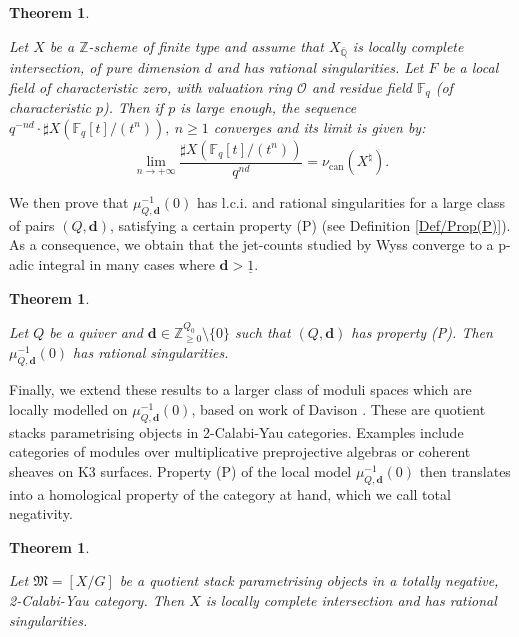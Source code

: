 \documentclass[11pt,english]{article}
\numberwithin{equation}{section}
\numberwithin{figure}{section}
\theoremstyle{definition}
\theoremstyle{plain}
\newtheorem{thm}[df]{Theorem}
\theoremstyle{remark}
\newcommand\dd{\mathbf{d}}
\newcommand\ZZ{\mathbb{Z}}
\newcommand\QQ{\mathbb{Q}}
\newcommand\FF{\mathbb{F}}
\begin{document}
\begin{thm} \label{Thm/Ch3JetCountCanMeas}

Let $X$ be a $\mathbb{Z}$-scheme of finite type and assume that
$X_{\bar{\QQ}}$ is locally complete intersection, of pure dimension
$d$ and has rational singularities. Let $F$ be a local field of
characteristic zero, with valuation ring $\mathcal{O}$ and residue
field $\FF_{q}$ (of characteristic $p$). Then if $p$ is large enough,
the sequence $q^{-nd}\cdot\sharp X(\mathbb{F}_{q}[t]/(t^{n})),\ n\geq1$
converges and its limit is given by:\[
\underset{n\rightarrow +\infty}{\lim}\frac{\sharp X(\mathbb{F}_{q}[t]/(t^{n}))}{q^{nd}}
=
\nu_{\mathrm{can}}(X^{\natural}).
\]\end{thm}

We then prove that $\mu_{Q,\dd}^{-1}(0)$ has l.c.i. and rational
singularities for a large class of pairs $(Q,\dd)$, satisfying a
certain property (P) (see Definition \ref{Def/Prop(P)}). As a consequence,
we obtain that the jet-counts studied by Wyss converge to a p-adic
integral in many cases where $\dd>\underline{1}$.

\begin{thm} \label{Thm/Ch3RatSgTotNeg}

Let $Q$ be a quiver and $\dd\in\ZZ_{\geq0}^{Q_{0}}\setminus\{0\}$
such that $(Q,\dd)$ has property (P). Then $\mu_{Q,\dd}^{-1}(0)$
has rational singularities.

\end{thm}

Finally, we extend these results to a larger class of moduli spaces
which are locally modelled on $\mu_{Q,\dd}^{-1}(0)$, based on work
of Davison \cite{Dav21a}. These are quotient stacks parametrising
objects in 2-Calabi-Yau categories. Examples include categories of
modules over multiplicative preprojective algebras or coherent sheaves
on K3 surfaces. Property (P) of the local model $\mu_{Q,\dd}^{-1}(0)$
then translates into a homological property of the category at hand,
which we call total negativity.

\begin{thm} \label{Thm/Ch3RatSg2CYMod}

Let $\mathfrak{M}=[X/G]$ be a quotient stack parametrising objects
in a totally negative, 2-Calabi-Yau category. Then $X$ is locally
complete intersection and has rational singularities.

\end{thm}
\end{document}
